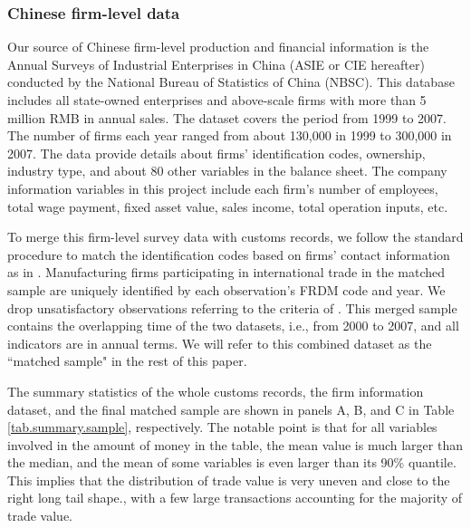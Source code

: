 \documentclass[12pt]{article}
\begin{document}
\subsubsection{Chinese firm-level data} \label{Data-CIE}

Our source of Chinese firm-level production and financial information is the Annual Surveys of Industrial Enterprises in China (ASIE or CIE hereafter) conducted by the National Bureau of Statistics of China (NBSC). This database includes all state-owned enterprises and above-scale firms with more than 5 million RMB in annual sales. The dataset covers the period from 1999 to 2007. The number of firms each year ranged from about 130,000 in 1999 to 300,000 in 2007. The data provide details about firms’ identification codes, ownership, industry type, and about 80 other variables in the balance sheet. The company information variables in this project include each firm's number of employees, total wage payment, fixed asset value, sales income, total operation inputs, etc.

To merge this firm-level survey data with customs records, we follow the standard procedure to match the identification codes based on firms' contact information as in \cite{fan-li-yeaple2015}. Manufacturing firms participating in international trade in the matched sample are uniquely identified by each observation's FRDM code and year. We drop unsatisfactory observations referring to the criteria of \cite{bkl2021}. This merged sample contains the overlapping time of the two datasets, i.e., from 2000 to 2007, and all indicators are in annual terms. We will refer to this combined dataset as the ``matched sample" in the rest of this paper.

The summary statistics of the whole customs records, the firm information dataset, and the final matched sample are shown in panels A, B, and C in Table \ref{tab.summary.sample}, respectively. The notable point is that for all variables involved in the amount of money in the table, the mean value is much larger than the median, and the mean of some variables is even larger than its 90\% quantile. This implies that the distribution of trade value is very uneven and close to the right long tail shape., with a few large transactions accounting for the majority of trade value.
\end{document}
